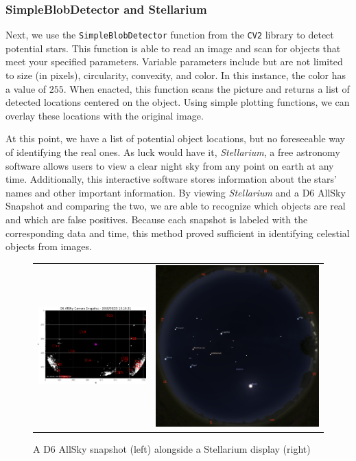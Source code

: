\subsubsection{SimpleBlobDetector and Stellarium}

Next, we use the \texttt{SimpleBlobDetector} function from the \texttt{CV2} library to detect potential stars.
This function is able to read an image and scan for objects that meet your specified parameters.
Variable parameters include but are not limited to size (in pixels), circularity, convexity, and color.
In this instance, the color has a value of $255$.  
When enacted, this function scans the picture and returns a list of detected locations centered on the object.
Using simple plotting functions, we can overlay these locations with the original image.

At this point, we have a list of potential object locations, but no foreseeable way of identifying the real ones.
As luck would have it, \textit{Stellarium}, a free astronomy software allows users to view a clear night sky from any point on earth at any time.
Additionally, this interactive software stores information about the stars' names and other important information.
By viewing \textit{Stellarium} and a D6 AllSky Snapshot and comparing the two, we are able to recognize which objects are real and which are false positives.
Because each snapshot is labeled with the corresponding data and time, this method proved sufficient in identifying celestial objects from images.

\begin{figure}[htb]
\centering
  \begin{tabular}{c|c}
    \includegraphics[width=.6\textwidth]{images/FourStarz_OneFrame.png} & \includegraphics[width=.4\textwidth]{images/zoom_stellarium.png}
  \end{tabular}
 \caption{A D6 AllSky snapshot (left) alongside a Stellarium display (right)}
  \label{star_recognition}
\end{figure}

